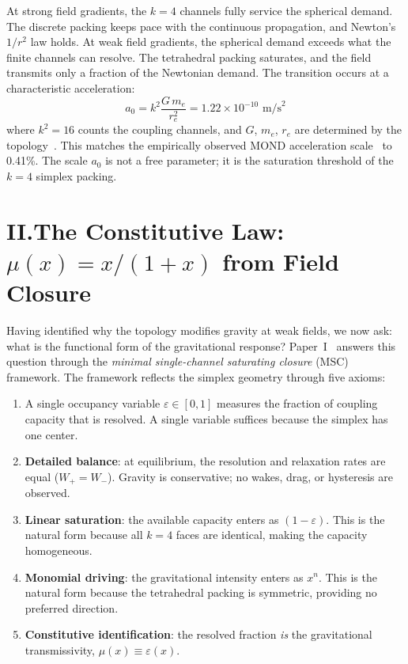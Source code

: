 \documentclass[11pt]{article}
\begin{document}
At strong field gradients, the $k = 4$ channels fully service the spherical demand. The discrete packing keeps pace with the continuous propagation, and Newton's $1/r^2$ law holds. At weak field gradients, the spherical demand exceeds what the finite channels can resolve. The tetrahedral packing saturates, and the field transmits only a fraction of the Newtonian demand. The transition occurs at a characteristic acceleration:
\begin{equation}
a_0 = k^2 \frac{G\, m_e}{r_e^2} = 1.22 \times 10^{-10} \text{ m/s}^2
\label{eq:a0-top}
\end{equation}
where $k^2 = 16$ counts the coupling channels, and $G$, $m_e$, $r_e$ are determined by the topology~\cite{nelson2026main}. This matches the empirically observed MOND acceleration scale~\cite{milgrom1983} to 0.41\%. The scale $a_0$ is not a free parameter; it is the saturation threshold of the $k = 4$ simplex packing.

\section*{II.\quad The Constitutive Law: $\mu(x) = x/(1+x)$ from Field Closure}

Having identified why the topology modifies gravity at weak fields, we now ask: what is the functional form of the gravitational response? Paper~I~\cite{paper1} answers this question through the \emph{minimal single-channel saturating closure} (MSC) framework. The framework reflects the simplex geometry through five axioms:

\begin{enumerate}[leftmargin=2em]
\item A single occupancy variable $\varepsilon \in [0,1]$ measures the fraction of coupling capacity that is resolved. A single variable suffices because the simplex has one center.
\item \textbf{Detailed balance}: at equilibrium, the resolution and relaxation rates are equal ($W_+ = W_-$). Gravity is conservative; no wakes, drag, or hysteresis are observed.
\item \textbf{Linear saturation}: the available capacity enters as $(1 - \varepsilon)$. This is the natural form because all $k = 4$ faces are identical, making the capacity homogeneous.
\item \textbf{Monomial driving}: the gravitational intensity enters as $x^n$. This is the natural form because the tetrahedral packing is symmetric, providing no preferred direction.
\item \textbf{Constitutive identification}: the resolved fraction \emph{is} the gravitational transmissivity, $\mu(x) \equiv \varepsilon(x)$.
\end{enumerate}
\end{document}
